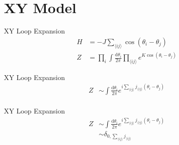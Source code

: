 \documentclass[10pt]{beamer}
\begin{document}
\section{XY Model}

\begin{frame}{XY Loop Expansion}
    \begin{align*}
        H &= - J \sum_{\langle ij \rangle} \cos(\theta_i - \theta_j) \\
        Z &= \prod_i \int \frac{\mathrm d \theta_i}{2 \pi} \prod_{\langle ij \rangle} e^{K  \cos(\theta_i - \theta_j)}
    \end{align*}
\end{frame}

\begin{frame}{XY Loop Expansion}
    \begin{align*}
        Z &\sim \int \frac{\mathrm d \theta_i}{2 \pi} e^{i \sum_{\langle ij \rangle} j_{\langle ij \rangle} (\theta_i - \theta_j)} \\
    \end{align*}
\end{frame}

\begin{frame}{XY Loop Expansion}
    \begin{align*}
        Z &\sim \int \frac{\mathrm d \theta_i}{2 \pi} e^{i \sum_{\langle ij \rangle} j_{\langle ij \rangle} (\theta_i - \theta_j)} \\
        & \sim \delta_{0, \sum_{\langle ij \rangle} j_{\langle ij \rangle}}
    \end{align*}
\end{frame}
\end{document}
